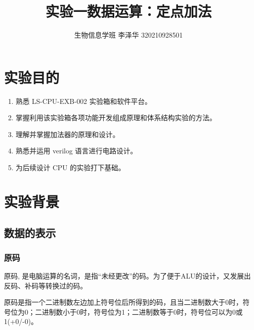 \documentclass[AutoFakeBold]{LZUThesis}
\begin{document}
\title{{实验一数据运算：定点加法}}


\author{生物信息学班 李泽华 320210928501}


\frontmatter



\customcontent

\mainmatter

\chapter{实验目的}
\begin{enumerate}
    \item 熟悉 LS-CPU-EXB-002 实验箱和软件平台。
    \item 掌握利用该实验箱各项功能开发组成原理和体系结构实验的方法。
    \item 理解并掌握加法器的原理和设计。
    \item 熟悉并运用 verilog 语言进行电路设计。
    \item 为后续设计 CPU 的实验打下基础。
\end{enumerate}
\chapter{实验背景}
\section{数据的表示}
    \subsection{原码}
    原码, 是电脑运算的名词，是指“未经更改”的码。为了便于ALU的设计，又发展出反码、补码等转换过的码。\par
    原码是指一个二进制数左边加上符号位后所得到的码，且当二进制数大于0时，符号位为0；二进制数小于0时，符号位为1；二进制数等于0时，符号位可以为0或1(+0/-0)。\par
\end{document}
